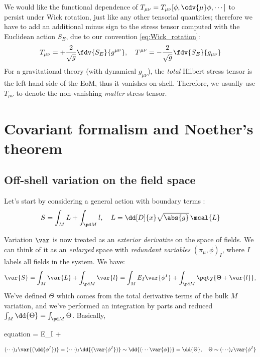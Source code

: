 \documentclass[a4paper
	,10pt
]{article}
\begin{document}
\begin{itemize}
	We would like the functional dependence of $
		T_{\mu\nu}
		= T_{\mu\nu}[\phi,\cdv{\mu} \phi,\cdots]
	$ to persist under Wick rotation, just like any other tensorial quantities; therefore we have to add an additional minus sign to the stress tensor computed with the Euclidean action $S_E$, due to our convention \eqref{eq:Wick_rotation}:
	\begin{equation}
		T_{\mu\nu}
		= + \frac{2}{\sqrt{g}}
			\fdv{S_E}{g^{\mu\nu}},
	\quad
		T^{\mu\nu}
		= - \frac{2}{\sqrt{g}}
			\fdv{S_E}{g_{\mu\nu}}
	\end{equation}
	For a gravitational theory (with dynamical $g_{\mu\nu}$), the \textit{total} Hilbert stress tensor is the left-hand side of the EoM, thus it vanishes on-shell. Therefore, we usually use $T_{\mu\nu}$ to denote the non-vanishing \textit{matter} stress tensor. 
	
	\end{itemize}
	
\pagebreak[4]
\section{Covariant formalism and Noether's theorem}
\subsection{Off-shell variation on the field space}
	\noindent
	Let's start by considering a general action with boundary terms \cite{Harlow:2019yfa}:
	\begin{equation}
		S = \int_M L + \int_{\pd M} l,
	\quad
		L = \dd[D]{x} \sqrt{\abs{g}}\,\mcal{L}
	\end{equation}
	
	Variation $\var$ is now treated as an \textit{exterior derivative} on the space of fields. We can think of it as an \textit{enlarged} space with \textit{redundant variables} $(\pi_\mu,\phi)_I$, where $I$ labels all fields in the system. We have:
	\begin{equation}
		\var{S}
		= \int_M \var{L}
			+ \int_{\pd M} \var{l}
		= \int_M E_I \var{\phi^I}
			+ \int_{\pd M} \pqty{\Theta + \var{l}},
	\end{equation}
	We've defined $\Theta$ which comes from the total derivative terms of the bulk $M$ variation, and we've performed an integration by parts and reduced $\int_M \dd{\Theta} = \int_{\pd M} \Theta$. Basically,
	\begin{empheq}{equation}
		= E_I  + \dd{\Theta}
	\end{empheq}
	\vspace{-.3\baselineskip}
	\begin{equation}
		({\cdots})_I \var{(\dd{\phi^I})}
		= ({\cdots})_I \dd{(\var{\phi^I})}
		\sim \dd{(\cdots \var{\phi})}
		= \dd{\Theta},
	\quad
		\Theta \sim ({\cdots})_I \var{\phi^I}
	\end{equation}
	
\end{document}
